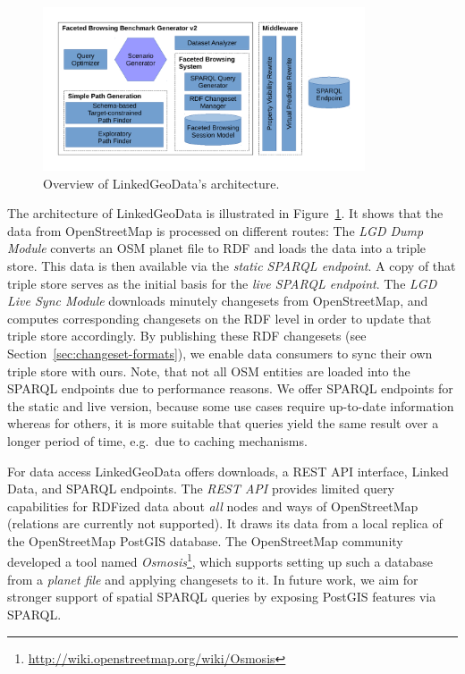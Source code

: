 \begin{figure}[htbp]
	\centering
		\includegraphics[width=0.85\textwidth]{images/Architecture.pdf}
	\caption{Overview of LinkedGeoData's architecture.}
	\label{fig:lgd-architecture}
\end{figure}

The architecture of LinkedGeoData is illustrated in Figure~\ref{fig:lgd-architecture}.
It shows that the data from OpenStreetMap is processed on different routes:
The \emph{LGD Dump Module} converts an OSM planet file to RDF and loads the data
into a triple store. This data is then available via the
\emph{static SPARQL endpoint}.  A copy of that triple store serves as the initial basis
for the \emph{live SPARQL endpoint}.   
The \emph{LGD Live Sync Module} downloads minutely changesets from OpenStreetMap, and computes corresponding changesets on the RDF level in order to update that
triple store accordingly. 
By publishing these RDF changesets (see Section~\ref{sec:changeset-formats}), we enable data consumers to sync their own triple store with ours. Note, that not all OSM entities are loaded into the SPARQL endpoints due to performance reasons.
We offer SPARQL endpoints for the static and live version, because some use cases require up-to-date information whereas for others, it is more suitable that queries yield the same result over a longer period of time, e.g.~due to caching mechanisms.

For data access LinkedGeoData offers downloads, a REST API interface, Linked Data, and SPARQL endpoints.
The \emph{REST API} provides limited query capabilities for RDFized data
about \emph{all} nodes and ways of OpenStreetMap (relations are currently not
supported). It draws its data from a local replica of the OpenStreetMap PostGIS database.
The OpenStreetMap community developed a tool named 
\emph{Osmosis}\footnote{\url{http://wiki.openstreetmap.org/wiki/Osmosis}}, which
supports setting up such a database from a \textit{planet file} and applying
changesets to it. 
In future work, we aim for stronger support of spatial SPARQL queries by exposing PostGIS features via SPARQL.

